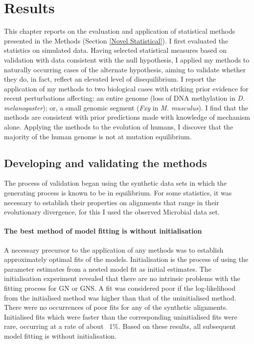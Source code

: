 \chapter{Results}

This chapter reports on the evaluation and application of statistical methods presented in the Methods (Section \ref{Novel Statistical}). I first evaluated the statistics on simulated data. Having selected statistical measures based on validation with data consistent with the null hypothesis, I applied my methods to naturally occurring cases of the alternate hypothesis, aiming to validate whether they do, in fact, reflect an elevated level of disequilibrium. I report the application of my methods to two biological cases with striking prior evidence for recent perturbations affecting: an entire genome (loss of DNA methylation in \textit{D. melanogaster}); or, a small genomic segment (\textit{Fxy} in \textit{M. musculus}). I find that the methods are consistent with prior predictions made with knowledge of mechanism alone. Applying the methods to the evolution of humans, I discover that the majority of the human genome is not at mutation equilibrium.

\section{Developing and validating the methods}
\label{Simulation}

The process of validation began using the synthetic data sets in which the generating process is known to be in equilibrium. For some statistics, it was necessary to establish their properties on alignments that range in their evolutionary divergence, for this I used the observed Microbial data set.  

\subsubsection{The best method of model fitting is without initialisation}

A necessary precursor to the application of any methods was to establish approximately optimal fits of the models. Initialisation is the process of using the parameter estimates from a nested model fit  as initial estimates. The initialisation experiment revealed that there are no intrinsic problems with the fitting process for GN or GNS. A fit was considered poor if the log-likelihood from the initialised method was higher than that of the uninitialised method. There were no occurrences of poor fits for any of the synthetic alignments. Initialised fits which were faster than the corresponding uninitialised fits were rare, occurring at a rate of about ~1\%. Based on these results, all subsequent model fitting is without initialisation.

